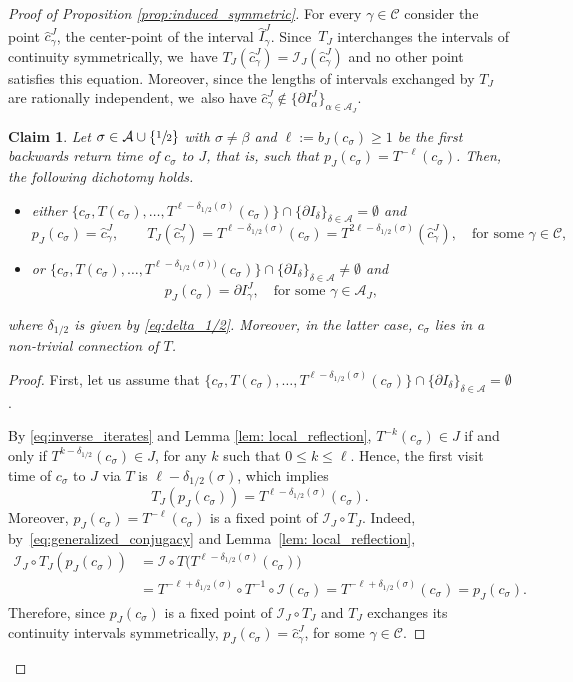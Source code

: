 \documentclass[JEP,XML,SOM,Unicode,NoEqCountersInSection,NoFloatCountersInSection,published]{cedram}
\theoremstyle{plain}
\newtheorem{claim}{Claim}
\theoremstyle{definition}
\newcommand{\A}{\mathcal{A}}
\newcommand{\I}{\mathcal{I}}
\begin{document}
\begin{proof}[Proof of Proposition \ref{prop:induced_symmetric}]
For every $\gamma\in\mathcal C$ consider the point $\hat c_\gamma^J$, the center-point of the interval $\hat I^J_{\gamma}$. Since~$T_J$ interchanges the intervals of continuity symmetrically, we~have $T_J(\hat c_\gamma^J)=\I_J(\hat c_\gamma^J)$ and no other point satisfies this equation. Moreover, since the lengths of intervals exchanged by $T_J$ are rationally independent, we~also have $\hat c_\gamma^J \notin\{\partial I^J_{\alpha}\}_{\alpha\in\A_J}$.

\begin{claim}
\label{cl:backward_centers}
Let $\sigma \in \A \cup \{\sfrac{1}{2}\}$ with $\sigma \neq \beta$ and $\ell := b_J(c_\sigma) \geq 1$ be the first backwards return time of $c_\sigma$ to $J$, that is, such that $p_J(c_\sigma) = T^{-\ell}(c_\sigma)$. Then, the following dichotomy holds.
\begin{itemize}
\item either $\{c_\sigma, T(c_\sigma), \ldots, T^{\ell - \delta_{1/2}(\sigma)}(c_\sigma)\} \cap \{\partial I_\delta\}_{\delta \in \A} = \emptyset$ and
\[
p_J(c_\sigma) = \hat c_\gamma^J,\qquad T_J(\hat c_\gamma^J) = T^{\ell - \delta_{1/2}(\sigma)}(c_\sigma) = T^{2\ell - \delta_{1/2}(\sigma)}(\hat c_\gamma^J), \quad \text{for some } \gamma \in \mathcal C,
\]
\item or $\{c_\sigma, T(c_\sigma), \ldots, T^{\ell - \delta_{1/2}(\sigma))}(c_\sigma)\} \cap \{\partial I_\delta\}_{\delta \in \A} \neq \emptyset$ and
\[
p_J(c_\sigma) = \partial I_\gamma^J,\quad\text{for some } \gamma \in \A_J,
\]
\end{itemize}
where $\delta_{1/2}$ is given by \eqref{eq:delta_1/2}. Moreover, in the latter case, $c_\sigma$ lies in a non-trivial connection of $T$.
\end{claim}

\begin{proof}
First, let us assume that $\{c_\sigma, T(c_\sigma), \ldots, T^{\ell - \delta_{1/2}(\sigma)}(c_\sigma)\} \cap \{\partial I_\delta\}_{\delta \in \A} = \emptyset$.

By \eqref{eq:inverse_iterates} and Lemma \ref{lem: local_reflection},
$T^{-k}(c_\sigma) \in J$ if and only if $T^{k - \delta_{1/2}}(c_\sigma) \in J$,
for any $k$ such that $0 \leq k \leq \ell$. Hence, the first visit time of $c_\sigma$ to $J$
via $T$ is $\ell - \delta_{1/2}(\sigma)$, which implies
\[
T_J(p_J(c_\sigma)) = T^{\ell - \delta_{1/2}(\sigma)}(c_\sigma).
\]
Moreover, $p_J(c_\sigma) = T^{-\ell}(c_\sigma)$ is a fixed point of $\I_J \circ T_J$. Indeed, by~\eqref{eq:generalized_conjugacy} and Lemma~\ref{lem: local_reflection},
\begin{align*}
\I_J \circ T_J(p_J(c_\sigma)) &= \I \circ T \big( T^{\ell -
\delta_{1/2}(\sigma)}(c_\sigma) \big) \\
&= T^{-\ell + \delta_{1/2}(\sigma)}\circ
T^{-1} \circ \I (c_\sigma) = T^{-\ell + \delta_{1/2}(\sigma)} (c_\sigma) =
p_J(c_\sigma).
\end{align*}
Therefore, since $p_J(c_\sigma)$ is a fixed point of $\I_J \circ T_J$ and $T_J$ exchanges its continuity intervals symmetrically, $p_J(c_\sigma) = \hat c_\gamma^J$, for some $\gamma \in \mathcal C$.


\end{proof}
\end{proof}
\end{document}
